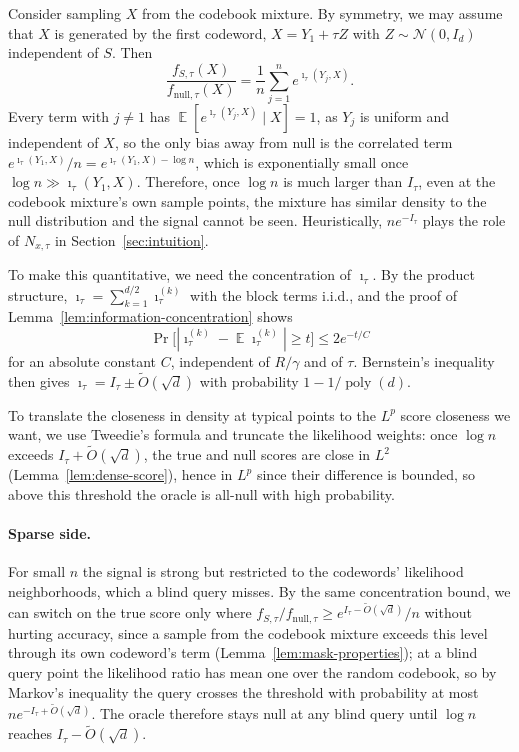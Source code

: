 \documentclass[11pt,letterpaper]{article}
\DeclareMathOperator*{\E}{\mathbb{E}}
\DeclareMathOperator*{\poly}{poly}
\newcommand{\1}{\mathbbm{1}}
\begin{document}
Consider sampling $X$ from the codebook mixture.  By symmetry, we may assume
that $X$ is generated by the first codeword, $X=Y_1+\tau Z$ with
$Z\sim\mathcal N(0,I_d)$ independent of $S$.  Then
\[
  \frac{f_{S,\tau}(X)}{f_{\mathrm{null},\tau}(X)}
  =\frac1n\sum_{j=1}^n e^{\imath_\tau(Y_j,X)}.
\]
Every term with $j\ne1$ has $\E[e^{\imath_\tau(Y_j,X)}\mid X]=1$, as $Y_j$ is
uniform and independent of $X$, so the only bias away from null is the
correlated term $e^{\imath_\tau(Y_1,X)}/n=e^{\imath_\tau(Y_1,X)-\log n}$,
which is exponentially small once $\log n\gg\imath_\tau(Y_1,X)$.  Therefore, once
$\log n$ is much larger than $I_\tau$, even at the codebook mixture's own
sample points, the mixture has similar density to the null distribution
and the signal cannot be seen.  Heuristically, $ne^{-I_\tau}$ plays the role
of $N_{x,\tau}$ in Section~\ref{sec:intuition}.

To make this quantitative, we need the concentration of $\imath_\tau$.  By
the product structure, $\imath_\tau=\sum_{k=1}^{d/2}\imath_\tau^{(k)}$ with
the block terms i.i.d., and the proof of
Lemma~\ref{lem:information-concentration} shows
\[
  \Pr\bigl[|\imath_\tau^{(k)}-\E\imath_\tau^{(k)}|\ge t\bigr]\le2e^{-t/C}
\]
for an absolute constant $C$, independent of $R/\gamma$ and of $\tau$.
Bernstein's inequality then gives
${\imath_\tau=I_\tau\pm\widetilde O(\sqrt d)}$ with probability
$1-1/\poly(d)$.

To translate the closeness in density at typical points to the $L^p$ score
closeness we want, we use Tweedie's formula and truncate the likelihood
weights: once $\log n$ exceeds $I_\tau+\widetilde O(\sqrt d)$, the true and
null scores are close in $L^2$ (Lemma~\ref{lem:dense-score}), hence in $L^p$
since their difference is bounded, so above this threshold the oracle is
all-null with high probability.

\paragraph{Sparse side.}
For small $n$ the signal is strong but restricted to the codewords'
likelihood neighborhoods, which a blind query misses.  By the same
concentration bound, we can switch on the true score only where
$f_{S,\tau}/f_{\mathrm{null},\tau}\ge e^{I_\tau-\widetilde O(\sqrt d)}/n$
without hurting accuracy, since a sample from the codebook mixture exceeds
this level through its own codeword's term
(Lemma~\ref{lem:mask-properties}); at a blind query point the likelihood
ratio has mean one over the random codebook, so by Markov's inequality the
query crosses the threshold with probability at most
$n e^{-I_\tau+\widetilde O(\sqrt d)}$.  The oracle therefore stays null at
any blind query until $\log n$ reaches $I_\tau-\widetilde O(\sqrt d)$.
\end{document}
